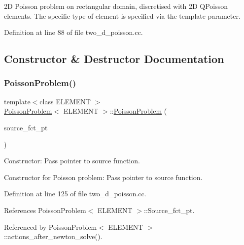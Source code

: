 2D Poisson problem on rectangular domain, discretised with 2D Q\+Poisson elements. The specific type of element is specified via the template parameter. 

Definition at line 88 of file two\+\_\+d\+\_\+poisson.\+cc.



\subsection{Constructor \& Destructor Documentation}
\mbox{\label{classPoissonProblem_a9c28346c473d246d8f61022365e742ea}} 
\subsubsection{\texorpdfstring{Poisson\+Problem()}{PoissonProblem()}\hspace{0.1cm}{\footnotesize\ttfamily [1/3]}}
{\footnotesize\ttfamily template$<$class E\+L\+E\+M\+E\+NT $>$ \\
\hyperlink{classPoissonProblem}{Poisson\+Problem}$<$ E\+L\+E\+M\+E\+NT $>$\+::\hyperlink{classPoissonProblem}{Poisson\+Problem} (\begin{DoxyParamCaption}\item[{Poisson\+Equations$<$ 2 $>$\+::Poisson\+Source\+Fct\+Pt}]{source\+\_\+fct\+\_\+pt }\end{DoxyParamCaption})}



Constructor\+: Pass pointer to source function. 

Constructor for Poisson problem\+: Pass pointer to source function. 

Definition at line 125 of file two\+\_\+d\+\_\+poisson.\+cc.



References Poisson\+Problem$<$ E\+L\+E\+M\+E\+N\+T $>$\+::\+Source\+\_\+fct\+\_\+pt.



Referenced by Poisson\+Problem$<$ E\+L\+E\+M\+E\+N\+T $>$\+::actions\+\_\+after\+\_\+newton\+\_\+solve().

\mbox{\label{classPoissonProblem_ac247e42d2d292200617f4b9db7ed1ab8}} 
